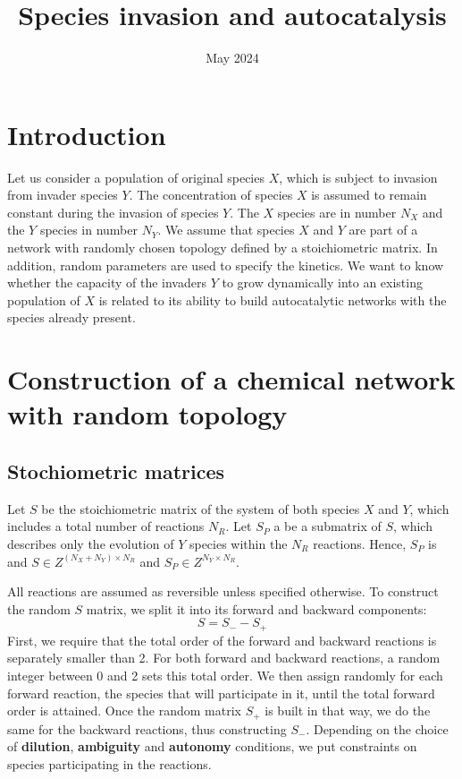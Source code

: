 \documentclass{article}
\title{Species invasion and autocatalysis}
\date{May 2024}
\begin{document}
\maketitle

\section{Introduction}
Let us consider a population of original species $X$, which is subject to invasion from invader species $Y$. The concentration of species $X$ is assumed to remain constant during the invasion of species $Y$. The $X$ species are in number $N_X$ and the $Y$ species in number $N_Y$. We assume that species $X$ and $Y$ are part of a network with randomly chosen topology defined by a stoichiometric matrix. In addition, random parameters are used to specify the kinetics.  We want to know whether the capacity of the invaders $Y$ to grow dynamically into an existing population of $X$ is related to its ability to build autocatalytic networks with the species already present. 

\section{Construction of a chemical network with random topology}
\subsection{Stochiometric matrices}
Let $S$ be the stoichiometric matrix of the system of both species $X$ and $Y$, which  includes a total number of reactions $N_R$. Let $S_P$ a be a submatrix of $S$, which describes only the evolution of $Y$ species within the $N_R$ reactions. Hence, $S_P$ is and $S \in Z^{(N_X+N_Y) \times N_R}$ and 
$S_P \in  Z^{N_Y \times N_R}$.

All reactions are assumed as reversible unless specified otherwise. To construct the random $S$ matrix, we split it into its forward and backward components:
\begin{equation}
    S= S_- - S_+
\end{equation}
First, we require that the total order of the forward and backward reactions is separately smaller than 2. For both forward and backward reactions, a random integer between 0 and 2 sets this total order. We then assign randomly for each forward reaction, the species that will participate in it, until the total forward order is attained. Once the random matrix $S_+$ is built in that way, we do the same for the backward reactions, thus constructing $S_-$. Depending on the choice of \textbf{dilution}, \textbf{ambiguity} and \textbf{autonomy} conditions, we put constraints on species participating in the reactions.
\end{document}
